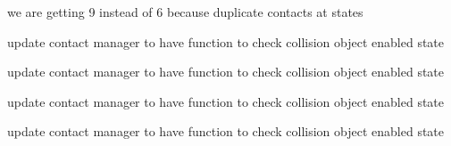 \begin{DoxyRefList}
\label{todo__todo000012}%
%
we are getting 9 instead of 6 because duplicate contacts at states  
\item[Member \mbox{\hyperlink{tesseract__environment__unit_8cpp_ac000b39be53683eced961b8e905d5050}{TEST}} (Tesseract\+Environment\+Unit, Env\+Set\+Active\+Discrete\+Contact\+Manager\+Command\+Unit)]\label{todo__todo000011}%
%
update contact manager to have function to check collision object enabled state  
\item[Member \mbox{\hyperlink{tesseract__environment__unit_8cpp_a48e8ba4aff90b6492e3905dc3d9a2686}{TEST}} (Tesseract\+Environment\+Unit, Env\+Set\+Active\+Continuous\+Contact\+Manager\+Command\+Unit)]\label{todo__todo000010}%
%
update contact manager to have function to check collision object enabled state  
\item[Member \mbox{\hyperlink{tesseract__environment__unit_8cpp_aa8be7c5729a18846a93f15be668f8d93}{TEST}} (Tesseract\+Environment\+Unit, Env\+Change\+Link\+Visibility\+Command\+Unit)]\label{todo__todo000009}%
%
update contact manager to have function to check collision object enabled state  
\item[Member \mbox{\hyperlink{tesseract__environment__unit_8cpp_a0885de2a8da955b4bb9b9be73de49350}{TEST}} (Tesseract\+Environment\+Unit, Env\+Change\+Link\+Collision\+Enabled\+Command\+Unit)]\label{todo__todo000008}%
%
update contact manager to have function to check collision object enabled state 
\end{DoxyRefList}